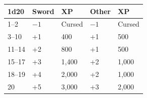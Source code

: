 \begin{multicols}{2}
\noindent \begin{minipage}{\columnwidth}

\label{weaponenchantment}
\noindent \begin{tabular}{|p{}|p{}|p{}|p{}|p{}|}
\hline
1d20	& Sword	& XP	& Other	& XP \\
\hline\hline
\rowcolor[gray]{.9}1--2	& $-1$	& Cursed	& $-1$	& Cursed \\
3--10	& +1	& 400	& +1	& 500 \\
\rowcolor[gray]{.9}11--14	& +2	& 800	& +1	& 500 \\
15--17	& +3	& 1,400	& +2	& 1,000 \\
\rowcolor[gray]{.9}18--19	& +4	& 2,000	& +2	& 1,000 \\
20	& +5	& 3,000	& +3	& 2,000 \\
\hline
\end{tabular}

\end{minipage}
 
\noindent \begin{minipage}{\columnwidth}


\end{minipage}
\end{multicols}
